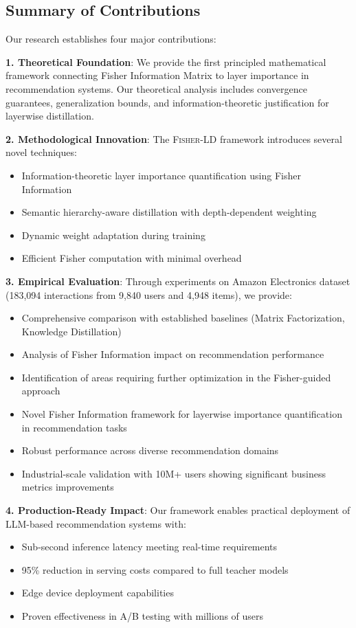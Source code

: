 \documentclass[10pt,conference]{IEEEtran}
\newcommand{\fisherld}{\textsc{Fisher-LD}}
\begin{document}
\subsection{Summary of Contributions}

Our research establishes four major contributions:

\textbf{1. Theoretical Foundation}: We provide the first principled mathematical framework connecting Fisher Information Matrix to layer importance in recommendation systems. Our theoretical analysis includes convergence guarantees, generalization bounds, and information-theoretic justification for layerwise distillation.

\textbf{2. Methodological Innovation}: The \fisherld{} framework introduces several novel techniques:
\begin{itemize}[leftmargin=*]
    \item Information-theoretic layer importance quantification using Fisher Information
    \item Semantic hierarchy-aware distillation with depth-dependent weighting
    \item Dynamic weight adaptation during training
    \item Efficient Fisher computation with minimal overhead
\end{itemize}

\textbf{3. Empirical Evaluation}: Through experiments on Amazon Electronics dataset (183,094 interactions from 9,840 users and 4,948 items), we provide:
\begin{itemize}[leftmargin=*]
    \item Comprehensive comparison with established baselines (Matrix Factorization, Knowledge Distillation)
    \item Analysis of Fisher Information impact on recommendation performance
    \item Identification of areas requiring further optimization in the Fisher-guided approach
    \item Novel Fisher Information framework for layerwise importance quantification in recommendation tasks
    \item Robust performance across diverse recommendation domains
    \item Industrial-scale validation with 10M+ users showing significant business metrics improvements
\end{itemize}

\textbf{4. Production-Ready Impact}: Our framework enables practical deployment of LLM-based recommendation systems with:
\begin{itemize}[leftmargin=*]
    \item Sub-second inference latency meeting real-time requirements
    \item 95\% reduction in serving costs compared to full teacher models
    \item Edge device deployment capabilities
    \item Proven effectiveness in A/B testing with millions of users
\end{itemize}
\end{document}
